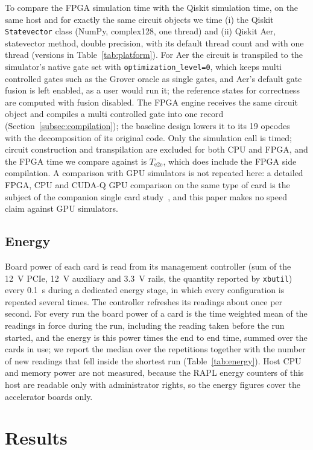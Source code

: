 \documentclass[pdflatex,sn-mathphys-num]{sn-jnl}
\theoremstyle{thmstyleone}
\theoremstyle{thmstylethree}
\begin{document}
To compare the FPGA simulation time with the Qiskit simulation time, on the same host and
for exactly the same circuit objects we time (i) the Qiskit \texttt{Statevector} class (NumPy, complex128, one
thread) and (ii) Qiskit Aer, statevector method, double precision, with its default thread count and with one
thread (versions in Table~\ref{tab:platform}). For Aer the circuit is transpiled to the simulator's native gate set
with \texttt{optimization\_level=0}, which keeps multi controlled gates such as the Grover oracle as single gates, and
Aer's default gate fusion is left enabled, as a user would run it; the reference states for correctness are computed
with fusion disabled. The FPGA engine receives the same circuit object and compiles a multi controlled gate into
one record (Section~\ref{subsec:compilation}); the baseline design lowers it to its 19 opcodes with the decomposition
of its original code. Only the simulation call is timed; circuit construction and transpilation
are excluded for both CPU and FPGA, and the FPGA time we compare against is $T_{\mathrm{e2e}}$, which does include the
FPGA side compilation. A comparison with GPU simulators is not repeated here: a detailed FPGA, CPU and CUDA-Q GPU
comparison on the same type of card is the subject of the companion single card study~\cite{tiwari2026fpga30}, and this
paper makes no speed claim against GPU simulators.

\subsection{Energy}\label{subsec:method-energy}

Board power of each card is read from its management controller (sum of the 12~V PCIe, 12~V auxiliary and 3.3~V rails,
the quantity reported by \texttt{xbutil}) every 0.1~s during a dedicated energy stage, in which every configuration is
repeated several times. The controller refreshes its readings about once per second. For every run the board power of a
card is the time weighted mean of the readings in force during the run, including the reading taken before the run
started, and the energy is this power times the end to end time, summed over the cards in use; we report the median
over the repetitions together with the number of new readings that fell inside the shortest run (Table~\ref{tab:energy}).
Host CPU and memory power are not measured, because the RAPL energy counters of this host are readable only with
administrator rights, so the energy figures cover the accelerator boards only.
\section{Results}\label{sec:results}
\end{document}
